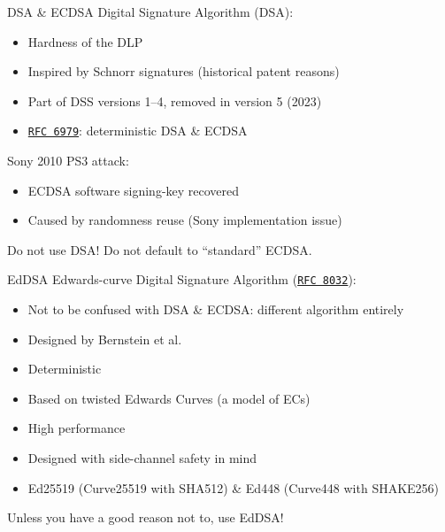 \begin{frame}{DSA \& ECDSA}
  \pause
  Digital Signature Algorithm (DSA):
  \begin{itemize}[<+(1)->]
    \item Hardness of the DLP
    \item Inspired by Schnorr signatures (historical patent reasons)
    \item Part of DSS versions 1--4, removed in version 5 (2023)
    \item \href{https://datatracker.ietf.org/doc/html/rfc6979}{\texttt{RFC 6979}}: deterministic DSA \& ECDSA
  \end{itemize}

  \pause
  Sony 2010 PS3 attack:
  \begin{itemize}
    \item ECDSA software signing-key recovered
    \item Caused by randomness reuse (Sony implementation issue)
  \end{itemize}
 
  \pause
  Do not use DSA! Do not default to \enquote{standard} ECDSA.
\end{frame}

\begin{frame}{EdDSA}
  Edwards-curve Digital Signature Algorithm (\href{https://datatracker.ietf.org/doc/html/rfc8032}{\texttt{RFC 8032}}):
  \begin{itemize}[<+(1)->]
    \item Not to be confused with DSA \& ECDSA: different algorithm entirely
    \item Designed by \alert{Bernstein} et al.
    \item Deterministic
    \item Based on twisted Edwards Curves (a model of ECs)
    \item High performance
    \item Designed with side-channel safety in mind
    \item Ed25519 (Curve25519 with SHA512) \& Ed448 (Curve448 with SHAKE256)
  \end{itemize}

  \pause
  Unless you have a good reason not to, use EdDSA!
\end{frame}

